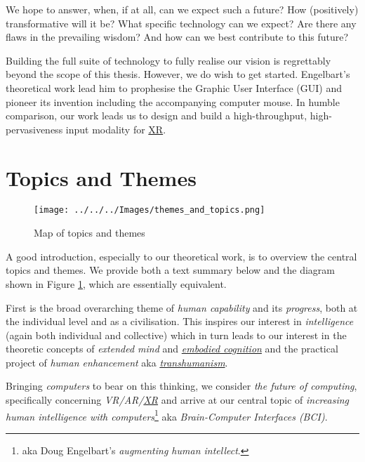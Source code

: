 \documentclass[logo,bsc,singlespacing,parskip]{infthesis}
\begin{document}
We hope to answer, when, if at all, can we expect such a future?
How (positively) transformative will it be?
What specific technology can we expect?
Are there any flaws in the prevailing wisdom? 
And how can we best contribute to this future?

Building the full suite of technology to fully realise our vision is regrettably beyond the scope of this thesis.
However, we do wish to get started.
Engelbart's theoretical work \autocite{engelbartAugmentingHumanIntellect1962}  lead him to prophesise the Graphic User Interface (GUI) and pioneer its invention including the accompanying computer mouse.
In humble comparison, our work leads us to design and build a high-throughput, high-pervasiveness input modality for \hyperref[org88b0f70]{XR}.

\chapter*{Topics and Themes}
\label{sec:orgeaba972}
\begin{figure}[h]
\centering
\texttt{[image: ../../../Images/themes\_and\_topics.png]}
\caption{\label{fig:topics_themes}Map of topics and themes}
\end{figure}

A good introduction, especially to our theoretical work, is to overview the central topics and themes.
We provide both a text summary below and the diagram shown in Figure \ref{fig:topics_themes}, which are essentially equivalent.

First is the broad overarching theme of \emph{human capability} and its \emph{progress}, both at the individual level and as a civilisation.
This inspires our interest in \emph{intelligence} (again both individual and collective) which in turn leads to our interest in
the theoretic concepts of \emph{extended mind} and \emph{\hyperref[orgb456c86]{embodied cognition}} and the practical project of \emph{human enhancement} aka \emph{\hyperref[org5708a5c]{transhumanism}}.

Bringing \emph{computers} to bear on this thinking, we consider \emph{the future of computing}, specifically concerning \emph{VR/AR/\hyperref[org88b0f70]{XR}} and arrive at our central topic of \emph{increasing human intelligence with computers}\footnote{aka Doug Engelbart's \emph{augmenting human intellect}.} aka \emph{Brain-Computer Interfaces (BCI)}.
\end{document}
